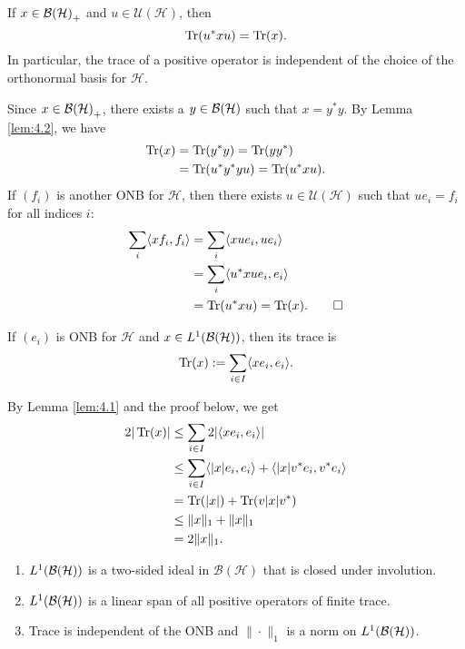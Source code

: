 \begin{corollary}
  If $x \in \operatorname{\mathcal{B} (\mathcal{H})}_+$ and $u \in \mathcal{U} (\mathcal{H})$, then 
  $$\operatorname{Tr} (u^* x u) = \operatorname{Tr} (x).$$
  In particular, the trace of a positive operator is independent of the choice of the 
  orthonormal basis for $\mathcal{H}$.
\end{corollary}

\begin{myproof}
  Since $x \in \operatorname{\mathcal{B} (\mathcal{H})}_+$, there exists a $y \in \operatorname{\mathcal{B} (\mathcal{H})}$
  such that $x = y^* y$. By Lemma \ref{lem:4.2}, we have 
  \begin{align*}
    \operatorname{Tr} (x) &= \operatorname{Tr} (y^* y) = \operatorname{Tr} (y y^*)\\
    &= \operatorname{Tr} (u^* y^* y u) = \operatorname{Tr} (u^* x u).
  \end{align*}
  If $(f_i)$ is another ONB for $\mathcal{H}$, then there exists $u \in \mathcal{U}(\mathcal{H})$ such that $u e_i = f_i$ for all indices $i$:
  \begin{align*}
    \sum_i \langle x f_i, f_i \rangle &= \sum_i \langle x u e_i, u e_i\rangle\\
    &= \sum_i \langle u^* x u e_i, e_i \rangle\\
    &= \operatorname{Tr} (u^* x u) = \operatorname{Tr} (x). \qedhere
  \end{align*}
\end{myproof}

\begin{definition}
  If $(e_i)$ is ONB for $\mathcal{H}$ and $x \in L^1 (\operatorname{\mathcal{B} (\mathcal{H})})$, then its trace is 
  $$\operatorname{Tr}(x) := \sum_{i \in I} \langle x e_i, e_i \rangle.$$
\end{definition}

By Lemma \ref{lem:4.1} and the proof below, we get
\begin{align*}
  2 | \operatorname{Tr}(x) | &\leq \sum_{i \in I} 2|\langle xe_i, e_i\rangle|\\
  &\leq \sum_{i \in I} \langle |x|e_i, e_i\rangle + \langle |x| v^* e_i, v^* e_i\rangle\\
  &= \operatorname{Tr} (|x|) + \operatorname{Tr} (v |x| v^*) \\
  &\leq \|x\|_1 + \|x\|_1\\
  &= 2\| x\|_1.
\end{align*}

\begin{theorem}
  \begin{enumerate}
    \item $L^1 (\operatorname{\mathcal{B} (\mathcal{H})})$ is a two-sided ideal in $\mathcal{B}(\mathcal{H})$
    that is closed under involution. 
    \item $L^1 (\operatorname{\mathcal{B} (\mathcal{H})})$ is a linear span of all positive operators of finite trace.
    \item Trace is independent of the ONB and $\| \cdot \|_1$ is a norm on $L^1 (\operatorname{\mathcal{B} (\mathcal{H})})$.
  \end{enumerate}
\end{theorem}

